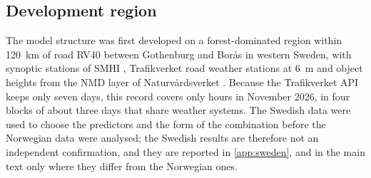 \subsection{Development region}
The model structure was first developed on a forest-dominated region within \SI{120}{km} of road RV40 between Gothenburg and Borås in western Sweden, with \seRef{} synoptic stations of SMHI \citep{SMHIopen}, \seTrv{} Trafikverket road weather stations at \SI{6}{m} \citep{TRVapi} and object heights from the NMD layer of Naturvårdsverket \citep{NMD}. Because the Trafikverket API keeps only seven days, this record covers only \seHours{} hours in November 2026, in four blocks of about three days that share weather systems. The Swedish data were used to choose the predictors and the form of the combination before the Norwegian data were analysed; the Swedish results are therefore not an independent confirmation, and they are reported in \ref{app:sweden}, and in the main text only where they differ from the Norwegian ones.
